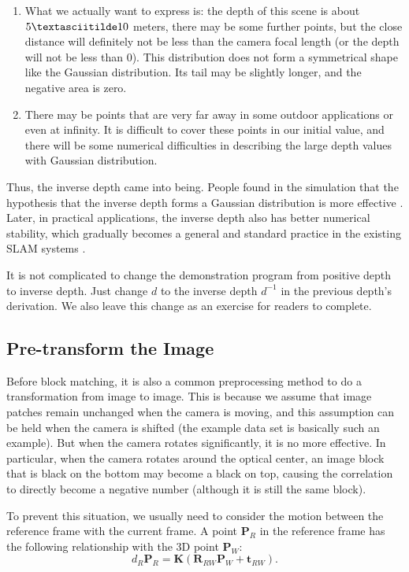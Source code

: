 \begin{enumerate}
	\item What we actually want to express is: the depth of this scene is about $5 \textasciitilde 10$ meters, there may be some further points, but the close distance will definitely not be less than the camera focal length (or the depth will not be less than 0). This distribution does not form a symmetrical shape like the Gaussian distribution. Its tail may be slightly longer, and the negative area is zero.
	\item There may be points that are very far away in some outdoor applications or even at infinity. It is difficult to cover these points in our initial value, and there will be some numerical difficulties in describing the large depth values with Gaussian distribution.
\end{enumerate}

Thus, the inverse depth came into being. People found in the simulation that the hypothesis that the inverse depth forms a Gaussian distribution is more effective {\cite{Civera2008}}. Later, in practical applications, the inverse depth also has better numerical stability, which gradually becomes a general and standard practice in the existing SLAM systems {\cite{Forster2014, Engel2014, Mur-Artal2015}}.

It is not complicated to change the demonstration program from positive depth to inverse depth. Just change $d$ to the inverse depth $d^{-1}$ in the previous depth's derivation. We also leave this change as an exercise for readers to complete.

\subsection{Pre-transform the Image}
Before block matching, it is also a common preprocessing method to do a transformation from image to image. This is because we assume that image patches remain unchanged when the camera is moving, and this assumption can be held when the camera is shifted (the example data set is basically such an example). But when the camera rotates significantly, it is no more effective. In particular, when the camera rotates around the optical center, an image block that is black on the bottom may become a black on top, causing the correlation to directly become a negative number (although it is still the same block).

To prevent this situation, we usually need to consider the motion between the reference frame with the current frame. A point $\mathbf{P}_R$ in the reference frame has the following relationship with the 3D point $\mathbf{P}_W$: 
\begin{equation}
	d_R {\mathbf{P}_R} = \mathbf{K} \left( {{\mathbf{R}_{{RW}}}{\mathbf{P}_W} + {\mathbf{t}_{{RW}}}} \right).
\end{equation}

